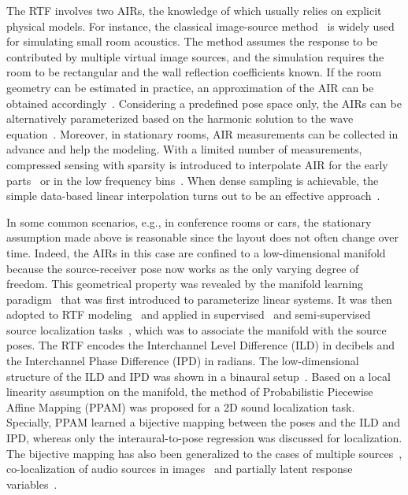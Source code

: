\documentclass[journal]{IEEEtran}
\begin{document}
The RTF involves two AIRs, the knowledge of which usually relies on explicit physical models. For instance, the classical image-source method~\cite{allen1979image} is widely used for simulating small room acoustics. The method assumes the response to be contributed by multiple virtual image sources, and the simulation requires the room to be rectangular and the wall reflection coefficients known. If the room geometry can be estimated in practice, an approximation of the AIR can be obtained accordingly~\cite{asaei2012computational,asaei2014structured}. Considering a predefined pose space only, the AIRs can be alternatively parameterized based on the harmonic solution to the wave equation~\cite{samarasinghe2015efficient}. Moreover, in stationary rooms, AIR measurements can be collected in advance and help the modeling. With a limited number of measurements, compressed sensing with sparsity is introduced to interpolate AIR for the early parts~\cite{mignot2013room} or in the low frequency bins~\cite{mignot2014low}. When dense sampling is achievable, the simple data-based linear interpolation turns out to be an effective approach~\cite{nishino1999interpolating,vincent2013second}.


In some common scenarios, e.g., in conference rooms or cars, the stationary assumption made above is reasonable since the layout does not often change over time. Indeed, the AIRs in this case are confined to a low-dimensional manifold because the source-receiver pose now works as the only varying degree of freedom. This geometrical property was revealed by the manifold learning paradigm~\cite{talmon2012parametrization} that was first introduced to parameterize linear systems. It was then adopted to RTF modeling~\cite{laufer2013relative,laufer2015study} and applied in supervised~\cite{talmon2011supervised} and semi-supervised source localization tasks~\cite{laufer2016mr,laufer2016semi}, which was to associate the manifold with the source poses. The RTF encodes the Interchannel Level Difference (ILD) in decibels and the Interchannel Phase Difference (IPD) in radians. The low-dimensional structure of the ILD and IPD was shown in a binaural setup~\cite{deleforge20122d}. Based on a local linearity assumption on the manifold, the method of Probabilistic Piecewise Affine Mapping (PPAM) was proposed for a 2D sound localization task. Specially, PPAM learned a bijective mapping between the poses and the ILD and IPD, whereas only the interaural-to-pose regression was discussed for localization. The bijective mapping has also been generalized to the cases of multiple sources~\cite{deleforge2015acoustic}, co-localization of audio sources in images~\cite{deleforge2015co} and partially latent response variables~\cite{deleforge2015high}.
\end{document}
